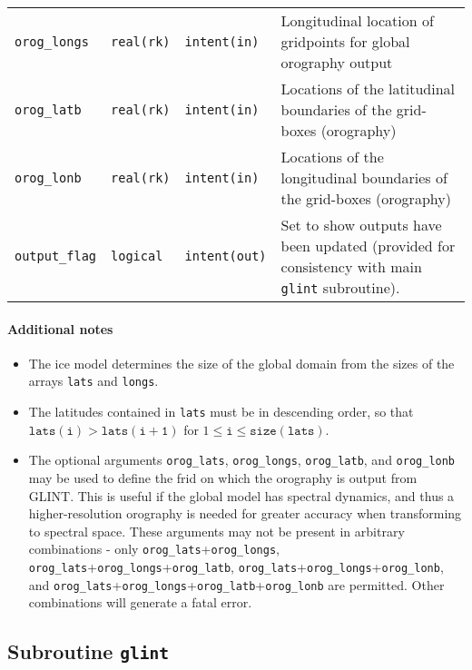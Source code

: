 \begin{center}
\begin{supertabular}{lllp{5.5cm}}
    \texttt{orog\_longs} & \texttt{real(rk)} & \texttt{intent(in)} &
    Longitudinal location of gridpoints for global orography output\\
    \texttt{orog\_latb} & \texttt{real(rk)} & \texttt{intent(in)} & Locations
    of the latitudinal boundaries of the grid-boxes (orography)\\
    \texttt{orog\_lonb} & \texttt{real(rk)} & \texttt{intent(in)} & Locations
    of the longitudinal boundaries of the grid-boxes (orography)\\
    \texttt{output\_flag} & \texttt{logical} & \texttt{intent(out)} & Set to
    show outputs have been updated (provided for consistency with main
    \texttt{glint} subroutine).\\
  \end{supertabular}
\end{center}
%
\paragraph{Additional notes}
%
\begin{itemize}
\item The ice model determines the size of the global domain from the sizes of
  the arrays \texttt{lats} and \texttt{longs}.
\item The latitudes contained in \texttt{lats} must be in descending order, so
  that $\mathtt{lats(i)}>\mathtt{lats(i+1)}$ for $1\leq \mathtt{i} \leq
  \mathtt{size(lats)}$.
\item The optional arguments \texttt{orog\_lats}, \texttt{orog\_longs},
  \texttt{orog\_latb}, and \texttt{orog\_lonb} may be used to define the frid
  on which the orography is output from GLINT. This is useful if the global
  model has spectral dynamics, and thus a higher-resolution orography is
  needed for greater accuracy when transforming to spectral space. These
  arguments may not be present in arbitrary combinations - only
  \texttt{orog\_lats}+\texttt{orog\_longs},
  \texttt{orog\_lats}+\texttt{orog\_longs}+\texttt{orog\_latb},
  \texttt{orog\_lats}+\texttt{orog\_longs}+\texttt{orog\_lonb}, and
  \texttt{orog\_lats}+\texttt{orog\_longs}+\texttt{orog\_latb}+\texttt{orog\_lonb}
  are permitted. Other combinations will generate a fatal error.
\end{itemize}
%
%
\subsection{Subroutine \texttt{glint}}
%
